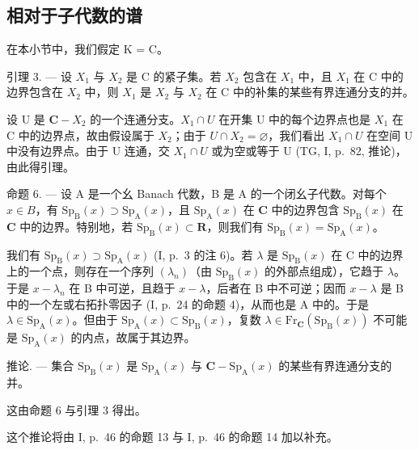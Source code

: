 \subsection{相对于子代数的谱}

在本小节中，我们假定 K = C。

引理 3. --- 设 \(X_{1}\) 与 \(X_{2}\) 是 C 的紧子集。若 \(X_{2}\) 包含在 \(X_{1}\) 中，且 \(X_{1}\) 在 C 中的边界包含在 \(X_{2}\) 中，则 \(X_{1}\) 是 \(X_{2}\) 与 \(X_{2}\) 在 C 中的补集的某些有界连通分支的并。

设 U 是 \(\mathbf{C}-X_{2}\) 的一个连通分支。\(X_{1} \cap U\) 在开集 U 中的每个边界点也是 \(X_{1}\) 在 C 中的边界点，故由假设属于 \(X_{2}\)；由于 \(U \cap X_{2} = \varnothing\)，我们看出 \(X_{1} \cap U\) 在空间 U 中没有边界点。由于 U 连通，交 \(X_{1} \cap U\) 或为空或等于 U (TG, I, p.~82, 推论)，由此得引理。

命题 6. — 设 A 是一个幺 Banach 代数，B 是 A 的一个闭幺子代数。对每个 \(x \in B\)，有 \(\mathrm{Sp}_{\mathrm{B}}(x) \supset \mathrm{Sp}_{\mathrm{A}}(x)\)，且 \(\mathrm{Sp}_{\mathrm{A}}(x)\) 在 \(\mathbf{C}\) 中的边界包含 \(\mathrm{Sp}_{\mathrm{B}}(x)\) 在 \(\mathbf{C}\) 中的边界。特别地，若 \(\mathrm{Sp}_{\mathrm{B}}(x) \subset \mathbf{R}\)，则我们有 \(\mathrm{Sp}_{\mathrm{B}}(x) = \mathrm{Sp}_{\mathrm{A}}(x)\)。

我们有 \(\mathrm{Sp}_{\mathrm{B}}(x) \supset \mathrm{Sp}_{\mathrm{A}}(x)\) (I, p.~3 的注 6)。若 \(\lambda\) 是 \(\mathrm{Sp}_{\mathrm{B}}(x)\) 在 C 中的边界上的一个点，则存在一个序列 \((\lambda_{n})\)（由 \(\mathrm{Sp}_{\mathrm{B}}(x)\) 的外部点组成），它趋于 \(\lambda\)。于是 \(x - \lambda_{n}\) 在 B 中可逆，且趋于 \(x - \lambda\)，后者在 B 中不可逆；因而 \(x - \lambda\) 是 B 中的一个左或右拓扑零因子 (I, p.~24 的命题 4)，从而也是 A 中的。于是 \(\lambda \in \mathrm{Sp}_{\mathrm{A}}(x)\)。但由于 \(\mathrm{Sp}_{\mathrm{A}}(x) \subset \mathrm{Sp}_{\mathrm{B}}(x)\)，复数 \(\lambda \in \mathrm{Fr}_{\mathbf{C}}(\mathrm{Sp}_{\mathrm{B}}(x))\) 不可能是 \(\mathrm{Sp}_{\mathrm{A}}(x)\) 的内点，故属于其边界。

推论. --- 集合 \(\mathrm{Sp}_{\mathrm{B}}(x)\) 是 \(\mathrm{Sp}_{\mathrm{A}}(x)\) 与 \(\mathbf{C}-\mathrm{Sp}_{\mathrm{A}}(x)\) 的某些有界连通分支的并。

这由命题 6 与引理 3 得出。

这个推论将由 I, p.~46 的命题 13 与 I, p.~46 的命题 14 加以补充。

